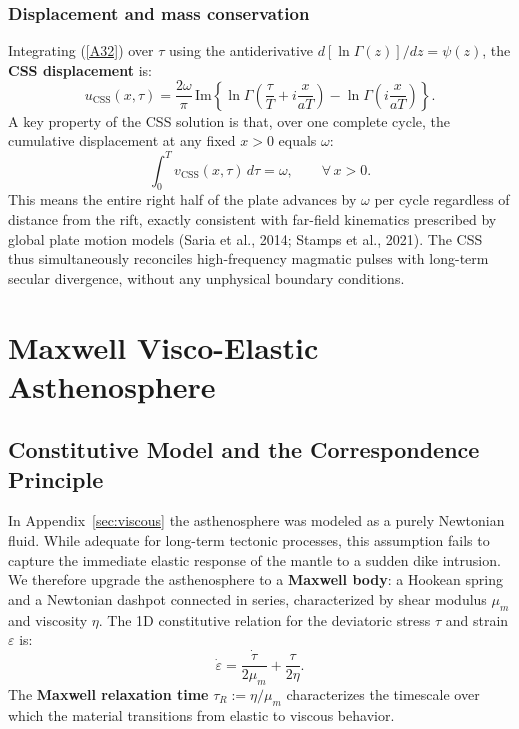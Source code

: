 \documentclass{article}
\newcommand{\IM}{\mathrm{Im}}
\begin{document}
\subsubsection{Displacement and mass conservation}

Integrating (\ref{A32}) over $\tau$ using the antiderivative
$d[\ln\Gamma(z)]/dz = \psi(z)$, the \textbf{CSS displacement} is:
\begin{equation}
\boxed{u_{\text{CSS}}(x,\tau) =
  \frac{2\omega}{\pi}\,\IM\!\left\{
    \ln\Gamma\!\left(\frac{\tau}{T}+i\frac{x}{aT}\right)
    - \ln\Gamma\!\left(i\frac{x}{aT}\right)
  \right\}.}
\label{A33}
\end{equation}
A key property of the CSS solution is that, over one complete cycle, the
cumulative displacement at any fixed $x>0$ equals $\omega$:
\begin{equation}
\int_0^T v_{\text{CSS}}(x,\tau)\,d\tau = \omega, \qquad \forall\,x>0.
\label{A34}
\end{equation}
This means the entire right half of the plate advances by $\omega$ per cycle
regardless of distance from the rift, exactly consistent with far-field
kinematics prescribed by global plate motion models (Saria et al., 2014;
Stamps et al., 2021). The CSS thus simultaneously reconciles high-frequency
magmatic pulses with long-term secular divergence, without any unphysical
boundary conditions.

\section{Maxwell Visco-Elastic Asthenosphere}
\label{sec:maxwell}

\subsection{Constitutive Model and the Correspondence Principle}

In Appendix~\ref{sec:viscous} the asthenosphere was modeled as a purely
Newtonian fluid. While adequate for long-term tectonic processes, this
assumption fails to capture the immediate elastic response of the mantle to a
sudden dike intrusion. We therefore upgrade the asthenosphere to a
\textbf{Maxwell body}: a Hookean spring and a Newtonian dashpot connected in
series, characterized by shear modulus $\mu_m$ and viscosity $\eta$. The 1D
constitutive relation for the deviatoric stress $\tau$ and strain $\varepsilon$
is:
\begin{equation}
\dot{\varepsilon} = \frac{\dot{\tau}}{2\mu_m} + \frac{\tau}{2\eta}.
\label{B1}
\end{equation}
The \textbf{Maxwell relaxation time} $\tau_R := \eta/\mu_m$ characterizes the
timescale over which the material transitions from elastic to viscous behavior.
\end{document}
